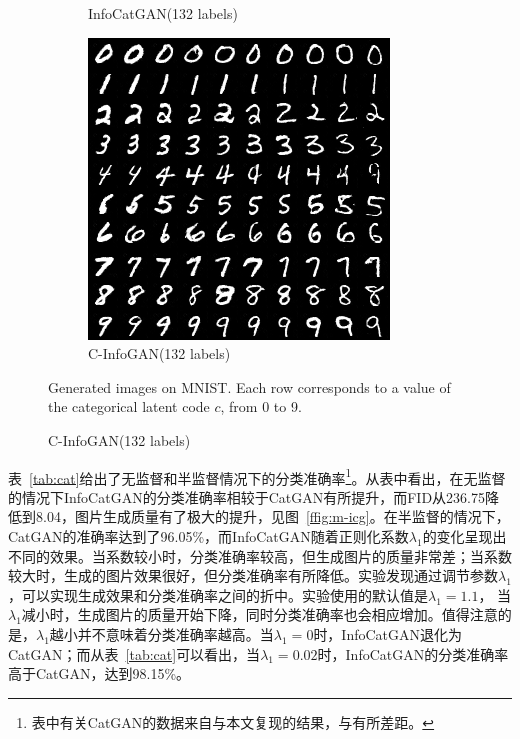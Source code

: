 \begin{figure}[htbp]
\begin{subfigure}[b]{\trif\textwidth}
    \caption{InfoCatGAN(132 labels)}
    \label{ffig:m-ss-icg}
  \end{subfigure}
  \begin{subfigure}[b]{\trif\textwidth}
    \includegraphics[width=\textwidth]{Img/ig-132labels.png}
    \caption{C-InfoGAN(132 labels)}
    \label{ffig:m-ss-ig}
  \end{subfigure}

  {Generated images on MNIST. Each row corresponds to a value of the categorical latent code $c$, from 0 to 9.}
  \label{fig:mnist}
\end{figure}

表~\ref{tab:cat}给出了无监督和半监督情况下的分类准确率\footnote{表中有关CatGAN的数据来自与本文复现的结果，与\citet{springenberg2015unsupervised}有所差距。}。从表中看出，在无监督的情况下InfoCatGAN的分类准确率相较于CatGAN有所提升，而FID从236.75降低到8.04，图片生成质量有了极大的提升，见图~\ref{ffig:m-icg}。在半监督的情况下，CatGAN的准确率达到了96.05\%，而InfoCatGAN随着正则化系数$\lambda_1$的变化呈现出不同的效果。当系数较小时，分类准确率较高，但生成图片的质量非常差；当系数较大时，生成的图片效果很好，但分类准确率有所降低。实验发现通过调节参数$\lambda_1$，可以实现生成效果和分类准确率之间的折中。实验使用的默认值是$\lambda_1 = 1.1$，
当$\lambda_1$减小时，生成图片的质量开始下降，同时分类准确率也会相应增加。值得注意的是，$\lambda_1$越小并不意味着分类准确率越高。当$\lambda_1=0$时，InfoCatGAN退化为CatGAN；而从表~\ref{tab:cat}可以看出，当$\lambda_1=0.02$时，InfoCatGAN的分类准确率高于CatGAN，达到98.15\%。

